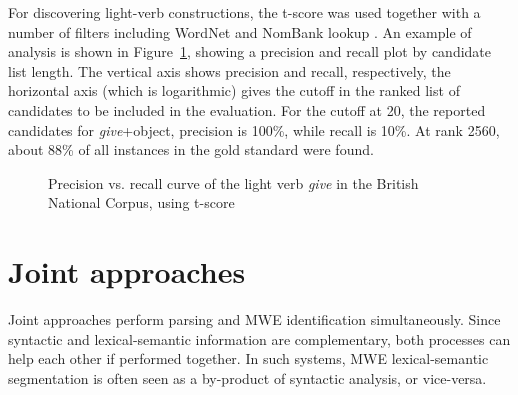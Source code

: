\documentclass[output=paper]{langsci/langscibook}
\begin{document}
For discovering light-verb constructions, the t-score was used together with a number of filters including WordNet and NomBank lookup \citep{ronan_schneider_mwe_15}. 
An example of analysis is shown in Figure~\ref{con:discover-lightverbs}, showing a precision and recall plot by candidate list length. The vertical axis shows precision and recall, respectively, the horizontal axis (which is logarithmic) gives the cutoff in the ranked list of candidates to be included in the evaluation. For the cutoff at 20, the reported candidates for \textit{give}+object, precision is 100\%, while recall is 10\%. At rank 2560, about 88\% of all instances in the gold standard were found.

\begin{figure}
\caption{Precision vs. recall curve of the light verb \textit{give} in the British National Corpus, using t-score \citep{ronan_schneider_mwe_15}}
\label{con:discover-lightverbs}
\end{figure}


%
\section{Joint approaches}
\label{con:sec:joint}

Joint approaches perform parsing and MWE identification simultaneously.
Since syntactic and lexical-semantic information are complementary, both processes can help each other if performed together.
In such systems, MWE lexical-seman\-tic segmentation is often seen as a by-product of syntactic analysis, or vice-versa.
\end{document}
